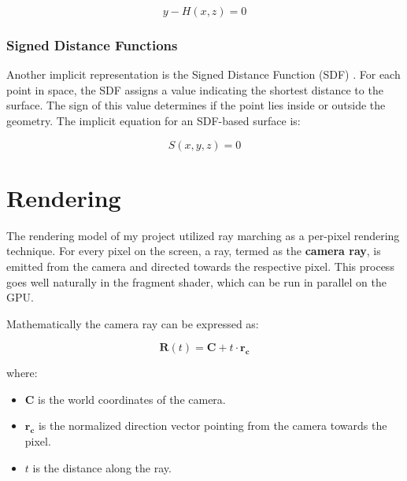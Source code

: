 \begin{equation}
y - H(x,z) = 0
\end{equation}

\subsubsection{Signed Distance Functions}
\label{SDF}

Another implicit representation is the Signed Distance Function (SDF) \cite{osher_signed_2006}. For each point in space, the SDF assigns a value indicating the shortest distance to the surface. The sign of this value determines if the point lies inside or outside the geometry. The implicit equation for an SDF-based surface is:

\begin{equation}
S(x,y,z) = 0 
\end{equation}



\section{Rendering}
\label{Rendering}

The rendering model of my project utilized ray marching as a per-pixel rendering technique. For every pixel on the screen, a ray, termed as the \textbf{camera ray}, is emitted from the camera and directed towards the respective pixel. This process goes well naturally in the fragment shader, which can be run in parallel on the GPU.

Mathematically the camera ray can be expressed as:

\begin{equation}
 \mathbf{R}(t) = \mathbf{C} + t\cdot\mathbf{r_c} 
\end{equation}

where:
\begin{itemize}
    \item $\mathbf{C}$ is the world coordinates of the camera.
    \item $\mathbf{r_c}$ is the normalized direction vector pointing from the camera towards the pixel.
    \item $t$ is the distance along the ray.
\end{itemize}

